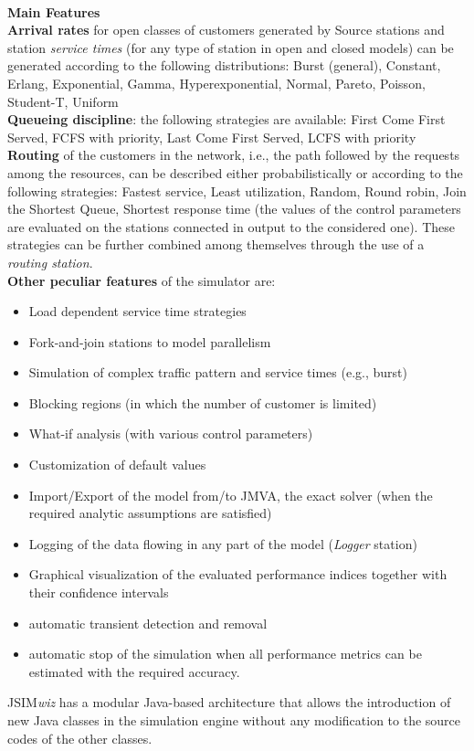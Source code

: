 \ \\
\noindent \textbf{\large Main Features}\\
\noindent \textbf{Arrival rates} for open classes of customers
generated by Source stations and station \emph{service times} (for
any type of station in open and closed models) can be generated
according to the following distributions: Burst (general),
Constant, Erlang, Exponential, Gamma, Hyperexponential, Normal,
Pareto, Poisson,
Student-T, Uniform \\

\noindent \textbf{Queueing discipline}: the following strategies
are available:  First Come First Served, FCFS with priority, Last
Come First Served, LCFS with priority\\

\noindent \textbf{Routing} of the customers in the network, i.e.,
the path followed by the requests among the resources, can be
described either probabilistically or according to the following
strategies: Fastest service, Least utilization, Random, Round
robin, Join the Shortest Queue, Shortest response time (the values
of the control parameters are evaluated on the stations connected
in output to the considered one). These strategies can be further
combined among themselves through the use of a \emph{routing
station}.\\

\noindent \textbf{Other peculiar features} of the simulator are:
\vspace{-0.2cm}
\begin{itemize}
    \item Load dependent service time strategies
    \item Fork-and-join stations to model parallelism
    \item Simulation of complex traffic pattern and service times (e.g., burst)
    \item Blocking regions (in which the number of customer is limited)
    \item What-if analysis (with various control parameters)
    \item Customization of default values
    \item Import/Export of the model from/to JMVA, the exact solver (when
    the required analytic assumptions are satisfied)
    \item Logging of the data flowing in any part of the model
    (\emph{Logger} station)
    \item Graphical visualization of the evaluated performance
    indices together with their confidence intervals
    \item automatic transient detection and removal
    \item automatic stop of the simulation when all performance
    metrics can be estimated with the required accuracy.
\end{itemize}
JSIM\emph{wiz} has a modular Java-based architecture that allows
the introduction of new Java classes in the simulation engine
without any modification to the source codes of the other classes.



